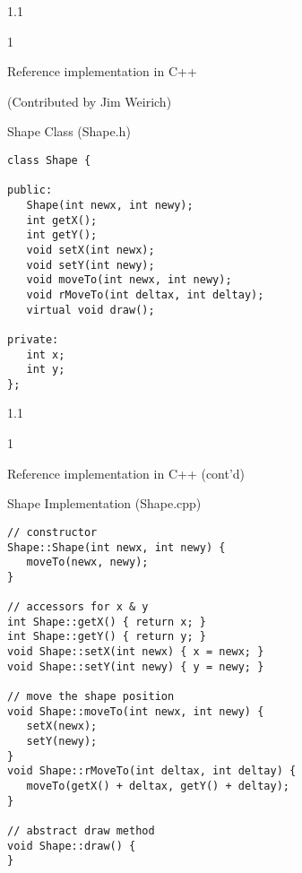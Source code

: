 \documentclass{slides}
\newenvironment{myslide}{\begin{slide}\color{Blue}\begin{boxedminipage}{1.1\hsize}\begin{boxedminipage}{1\hsize}\color{Black}
\vspace{-170\in}
}{%
\smallskip
\end{boxedminipage}
\end{boxedminipage}
\end{slide}}
\newenvironment{myslide}{\begin{slide}
}{%
\end{slide}}
\newenvironment{myslide}{\begin{slide}\color{White}\begin{boxedminipage}{1.1\hsize}\color{Black}
\vspace{-170\in}
}{%
\smallskip
\end{boxedminipage}
\end{slide}}
\newcommand{\header}[1]{{\large \color{Red} #1}}
\begin{document}



\begin{myslide}

\header{Reference implementation in C++}

(Contributed by Jim Weirich)

Shape Class (Shape.h)

{\tiny

\begin{verbatim}
class Shape {

public:
   Shape(int newx, int newy);
   int getX();
   int getY();
   void setX(int newx);
   void setY(int newy);
   void moveTo(int newx, int newy);
   void rMoveTo(int deltax, int deltay);
   virtual void draw();

private:
   int x;
   int y;
};
\end{verbatim}

}

\end{myslide}






\begin{myslide}

\header{Reference implementation in C++ (cont'd)}

Shape Implementation (Shape.cpp)

{\tiny

\begin{verbatim}
// constructor
Shape::Shape(int newx, int newy) {
   moveTo(newx, newy);
}

// accessors for x & y
int Shape::getX() { return x; }
int Shape::getY() { return y; }
void Shape::setX(int newx) { x = newx; }
void Shape::setY(int newy) { y = newy; }

// move the shape position
void Shape::moveTo(int newx, int newy) {
   setX(newx);
   setY(newy);
}
void Shape::rMoveTo(int deltax, int deltay) {
   moveTo(getX() + deltax, getY() + deltay);
}

// abstract draw method
void Shape::draw() {
}
\end{verbatim}

}

\end{myslide}
\end{document}
